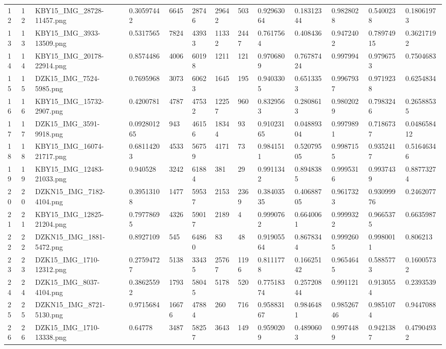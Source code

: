 \documentclass[11pt, a4paper, twoside]{report}
\begin{document}
\begin{longtable}[c]{@{}lllllllllllll@{}}
12 & 12 & KBY15\_IMG\_28728-11457.png & 0.30597442 & 6645 & 28746 & 29642 & 503 & 0.92963064 & 0.18312344 & 0.9828028 & 0.5400238 & 0.18061973 \\
13 & 13 & KBY15\_IMG\_3933-13509.png & 0.5317565 & 7824 & 43933 & 11332 & 2447 & 0.7617564 & 0.408436 & 0.9472402 & 0.78974915 & 0.36217192 \\
14 & 14 & KBY15\_IMG\_20178-22914.png & 0.8574486 & 4006 & 60198 & 1211 & 121 & 0.9706809 & 0.76787424 & 0.997994 & 0.9796753 & 0.7504683 \\
15 & 15 & DZK15\_IMG\_7524-5985.png & 0.7695968 & 3073 & 60623 & 1645 & 195 & 0.9403305 & 0.6513353 & 0.9967937 & 0.9719238 & 0.6254834 \\
16 & 16 & KBY15\_IMG\_15732-2907.png & 0.4200781 & 4787 & 47532 & 12257 & 960 & 0.8329563 & 0.2808613 & 0.9802029 & 0.7983246 & 0.26588535 \\
17 & 17 & DZK15\_IMG\_3591-9918.png & 0.092801265 & 943 & 46156 & 18344 & 93 & 0.91023165 & 0.04889304 & 0.9979891 & 0.7186737 & 0.048658412 \\
18 & 18 & KBY15\_IMG\_16074-21717.png & 0.68114203 & 4533 & 56759 & 4171 & 73 & 0.9841511 & 0.52079505 & 0.9987155 & 0.9352417 & 0.51646346 \\
19 & 19 & KBY15\_IMG\_12483-21033.png & 0.940528 & 3242 & 61884 & 381 & 29 & 0.9911342 & 0.8948385 & 0.9995316 & 0.9937439 & 0.88773274 \\
20 & 20 & DZKN15\_IMG\_7182-4104.png & 0.39513108 & 1477 & 59537 & 2153 & 2369 & 0.38403535 & 0.40688705 & 0.9617323 & 0.93099976 & 0.2462077 \\
21 & 21 & KBY15\_IMG\_12825-21204.png & 0.79778695 & 4326 & 59017 & 2189 & 4 & 0.9990762 & 0.6640061 & 0.9999322 & 0.9665375 & 0.6635987 \\
22 & 22 & DZKN15\_IMG\_1881-5472.png & 0.8927109 & 545 & 64860 & 83 & 48 & 0.91905564 & 0.8678344 & 0.9992605 & 0.9980011 & 0.806213 \\
23 & 23 & DZK15\_IMG\_1710-12312.png & 0.27594727 & 5138 & 33435 & 25767 & 1196 & 0.8111778 & 0.16625142 & 0.9654645 & 0.5885773 & 0.16005732 \\
24 & 24 & DZK15\_IMG\_8037-4104.png & 0.38625592 & 1793 & 58045 & 5178 & 520 & 0.77518374 & 0.25720844 & 0.991121 & 0.9130554 & 0.2393539 \\
25 & 25 & DZKN15\_IMG\_8721-5130.png & 0.9715684 & 16676 & 47884 & 260 & 716 & 0.95883167 & 0.9846481 & 0.98526746 & 0.9851074 & 0.9447088 \\
26 & 26 & DZK15\_IMG\_1710-13338.png & 0.64778 & 3487 & 58257 & 3643 & 149 & 0.9590209 & 0.4890603 & 0.9974489 & 0.9421387 & 0.47904932 \\

\end{longtable}
\end{document}
